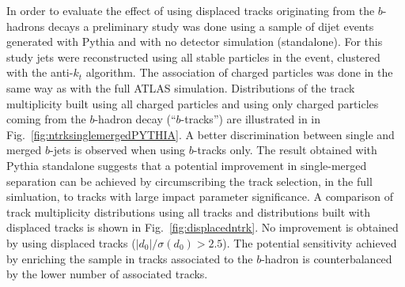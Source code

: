 In order to evaluate the effect of using displaced tracks originating from the $b$-hadrons decays a preliminary study was done using a sample of dijet events generated with {\sc Pythia} and with no detector simulation (standalone). For this study jets were reconstructed using all stable particles in the event, clustered with the anti-$k_t$ algorithm. The association of charged particles was done in the same way as with the full ATLAS simulation. Distributions of the track multiplicity built using all charged particles and using only charged particles coming from the $b$-hadron decay (``$b$-tracks'') are illustrated in  in Fig.~\ref{fig:ntrksinglemergedPYTHIA}. A better discrimination between single and merged $b$-jets is observed when using $b$-tracks only. The result obtained with {\sc Pythia} standalone suggests that a potential improvement in single-merged separation can be achieved by circumscribing the track selection, in the full simluation, to tracks with large impact parameter significance. %
 A comparison of track multiplicity distributions using all tracks and distributions built with displaced tracks is shown in Fig.~\ref{fig:displacedntrk}. No improvement is obtained by using displaced tracks ($|d_0|/\sigma(d_0)> 2.5$). The potential sensitivity achieved by enriching the sample in tracks associated to the $b$-hadron is counterbalanced by the lower number of associated tracks.

